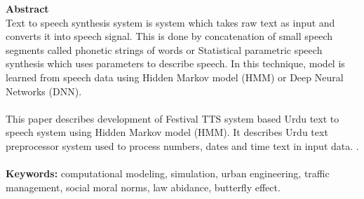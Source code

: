 
{\LARGE\textbf {Abstract}} \\ %
Text to speech synthesis system is system which takes raw text as input and converts it into speech signal.
This is done by concatenation of small speech segments called phonetic strings of words or 
Statistical parametric speech synthesis which uses parameters to describe speech. In
this technique, model is learned from speech data using Hidden Markov model (HMM) or Deep Neural Networks (DNN).
\\ \\
This paper describes development of Festival TTS system based Urdu text to speech system using Hidden Markov model (HMM). It describes Urdu text preprocessor 
system used to process numbers, dates and time text in input data. 
. \\ \\
\textbf{Keywords:}
computational modeling, simulation, urban engineering, traffic management, social moral norms, law abidance, butterfly effect.


